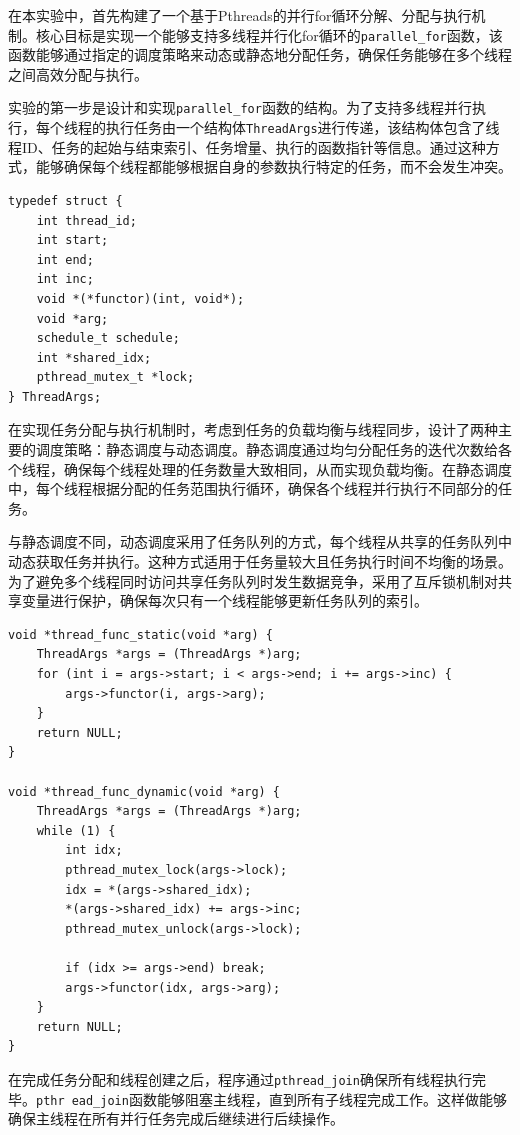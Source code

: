 \documentclass[a4paper, utf8]{ctexart}
\begin{document}
	在本实验中，首先构建了一个基于Pthreads的并行for循环分解、分配与执行机制。核心目标是实现一个能够支持多线程并行化for循环的\verb|parallel_for|函数，该函数能够通过指定的调度策略来动态或静态地分配任务，确保任务能够在多个线程之间高效分配与执行。
	
	实验的第一步是设计和实现\verb|parallel_for|函数的结构。为了支持多线程并行执行，每个线程的执行任务由一个结构体\verb|ThreadArgs|进行传递，该结构体包含了线程ID、任务的起始与结束索引、任务增量、执行的函数指针等信息。通过这种方式，能够确保每个线程都能够根据自身的参数执行特定的任务，而不会发生冲突。
	
	\begin{verbatim}
typedef struct {
    int thread_id;
    int start;
    int end;
    int inc;
    void *(*functor)(int, void*);
    void *arg;
    schedule_t schedule;
    int *shared_idx;
    pthread_mutex_t *lock;
} ThreadArgs;
	\end{verbatim}
	
	在实现任务分配与执行机制时，考虑到任务的负载均衡与线程同步，设计了两种主要的调度策略：静态调度与动态调度。静态调度通过均匀分配任务的迭代次数给各个线程，确保每个线程处理的任务数量大致相同，从而实现负载均衡。在静态调度中，每个线程根据分配的任务范围执行循环，确保各个线程并行执行不同部分的任务。
	
	与静态调度不同，动态调度采用了任务队列的方式，每个线程从共享的任务队列中动态获取任务并执行。这种方式适用于任务量较大且任务执行时间不均衡的场景。为了避免多个线程同时访问共享任务队列时发生数据竞争，采用了互斥锁机制对共享变量进行保护，确保每次只有一个线程能够更新任务队列的索引。
	
	\begin{verbatim}
void *thread_func_static(void *arg) {
    ThreadArgs *args = (ThreadArgs *)arg;
    for (int i = args->start; i < args->end; i += args->inc) {
        args->functor(i, args->arg);
    }
    return NULL;
}

void *thread_func_dynamic(void *arg) {
    ThreadArgs *args = (ThreadArgs *)arg;
    while (1) {
        int idx;
        pthread_mutex_lock(args->lock);
        idx = *(args->shared_idx);
        *(args->shared_idx) += args->inc;
        pthread_mutex_unlock(args->lock);

        if (idx >= args->end) break;
        args->functor(idx, args->arg);
    }
    return NULL;
}
	\end{verbatim}
	
	在完成任务分配和线程创建之后，程序通过\verb|pthread_join|确保所有线程执行完毕。\verb|pthr|\ \verb|ead_join|函数能够阻塞主线程，直到所有子线程完成工作。这样做能够确保主线程在所有并行任务完成后继续进行后续操作。
	
\end{document}
